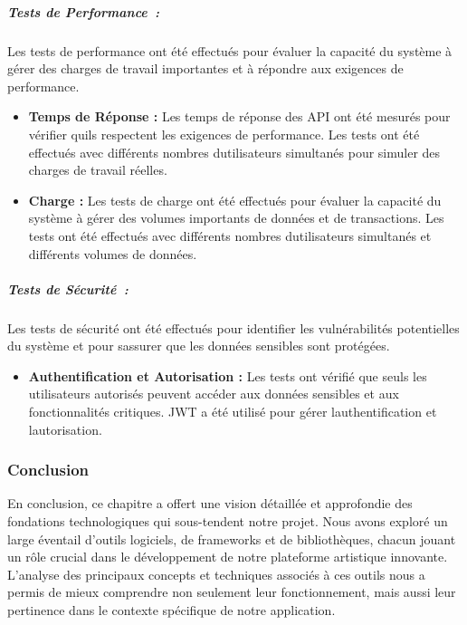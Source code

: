 \documentclass[12pt,a4paper,twoside,openright]{report}
\begin{document}
\hypertarget{tests-de-performance}{%
\subparagraph{Tests de Performance~:}\label{tests-de-performance}}

Les tests de performance ont été effectués pour évaluer la capacité du
système à gérer des charges de travail importantes et à répondre aux
exigences de performance.

\begin{itemize}
\item
  \textbf{Temps de Réponse :} Les temps de réponse des API ont été
  mesurés pour vérifier qu\textquotesingle ils respectent les exigences
  de performance. Les tests ont été effectués avec différents nombres
  d\textquotesingle utilisateurs simultanés pour simuler des charges de
  travail réelles.
\item
  \textbf{Charge :} Les tests de charge ont été effectués pour évaluer
  la capacité du système à gérer des volumes importants de données et de
  transactions. Les tests ont été effectués avec différents nombres
  d\textquotesingle utilisateurs simultanés et différents volumes de
  données.
\end{itemize}

\hypertarget{tests-de-suxe9curituxe9}{%
\subparagraph{Tests de Sécurité~:}\label{tests-de-suxe9curituxe9}}

Les tests de sécurité ont été effectués pour identifier les
vulnérabilités potentielles du système et pour s\textquotesingle assurer
que les données sensibles sont protégées.

\begin{itemize}
\item
  \textbf{Authentification et Autorisation :} Les tests ont vérifié que
  seuls les utilisateurs autorisés peuvent accéder aux données sensibles
  et aux fonctionnalités critiques. JWT a été utilisé pour gérer
  l\textquotesingle authentification et l\textquotesingle autorisation.
\end{itemize}

\hypertarget{conclusion-3}{%
\subsubsection{\texorpdfstring{\textbf{Conclusion}~}{Conclusion~}}\label{conclusion-3}}

En conclusion, ce chapitre a offert une vision détaillée et approfondie
des fondations technologiques qui sous-tendent notre projet. Nous avons
exploré un large éventail d'outils logiciels, de frameworks et de
bibliothèques, chacun jouant un rôle crucial dans le développement de
notre plateforme artistique innovante. L'analyse des principaux concepts
et techniques associés à ces outils nous a permis de mieux comprendre
non seulement leur fonctionnement, mais aussi leur pertinence dans le
contexte spécifique de notre application.
\end{document}
